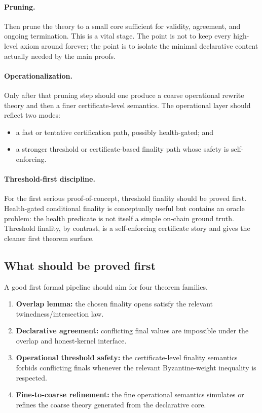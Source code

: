 \documentclass[11pt]{article}
\begin{document}
\paragraph{Pruning.}
Then prune the theory to a small core sufficient for validity, agreement, and ongoing termination. This is a vital stage. The point is not to keep every high-level axiom around forever; the point is to isolate the minimal declarative content actually needed by the main proofs.

\paragraph{Operationalization.}
Only after that pruning step should one produce a coarse operational rewrite theory and then a finer certificate-level semantics. The operational layer should reflect two modes:

\begin{itemize}
  \item a fast or tentative certification path, possibly health-gated; and
  \item a stronger threshold or certificate-based finality path whose safety is self-enforcing.
\end{itemize}

\paragraph{Threshold-first discipline.}
For the first serious proof-of-concept, threshold finality should be proved first. Health-gated conditional finality is conceptually useful but contains an oracle problem: the health predicate is not itself a simple on-chain ground truth. Threshold finality, by contrast, is a self-enforcing certificate story and gives the cleaner first theorem surface.

\subsection{What should be proved first}

A good first formal pipeline should aim for four theorem families.

\begin{enumerate}
  \item \textbf{Overlap lemma:} the chosen finality opens satisfy the relevant twinedness/intersection law.
  \item \textbf{Declarative agreement:} conflicting final values are impossible under the overlap and honest-kernel interface.
  \item \textbf{Operational threshold safety:} the certificate-level finality semantics forbids conflicting finals whenever the relevant Byzantine-weight inequality is respected.
  \item \textbf{Fine-to-coarse refinement:} the fine operational semantics simulates or refines the coarse theory generated from the declarative core.
\end{enumerate}
\end{document}
